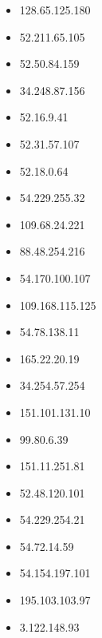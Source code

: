 \documentclass{article}
\begin{document}
\begin{itemize}
        \item 128.65.125.180
    
        \item 52.211.65.105
    
        \item 52.50.84.159
    
        \item 34.248.87.156
    
        \item 52.16.9.41
    
        \item 52.31.57.107
    
        \item 52.18.0.64
    
        \item 54.229.255.32
    
        \item 109.68.24.221
    
        \item 88.48.254.216
    
        \item 54.170.100.107
    
        \item 109.168.115.125
    
        \item 54.78.138.11
    
        \item 165.22.20.19
    
        \item 34.254.57.254
    
        \item 151.101.131.10
    
        \item 99.80.6.39
    
        \item 151.11.251.81
    
        \item 52.48.120.101
    
        \item 54.229.254.21
    
        \item 54.72.14.59
    
        \item 54.154.197.101
    
        \item 195.103.103.97
    
        \item 3.122.148.93
    

\end{itemize}
\end{document}
